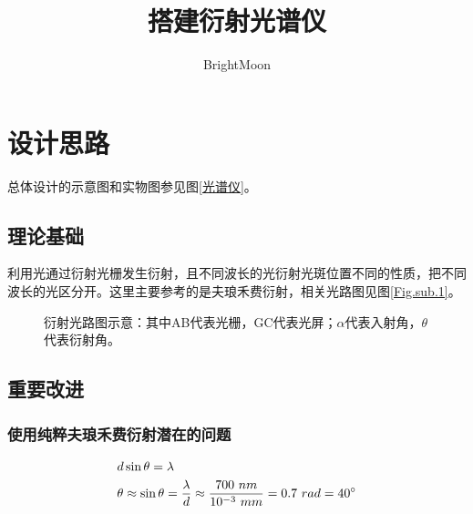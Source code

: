 \documentclass[UTF8]{ctexart}
\title{搭建衍射光谱仪}
\author{BrightMoon}
\begin{document}
\maketitle
\section{设计思路}
总体设计的示意图和实物图参见图\ref{光谱仪}。
\subsection{理论基础}
利用光通过衍射光栅发生衍射，且不同波长的光衍射光斑位置不同的性质，把不同波长的光区分开。这里主要参考的是夫琅禾费衍射，相关光路图见图\ref{Fig.sub.1}。
\begin{figure}
\centering  %
\caption{衍射光路图示意：其中AB代表光栅，GC代表光屏；$\alpha$代表入射角，$\theta$代表衍射角。}
\label{光路示意}
\end{figure}
\subsection{重要改进}
\subsubsection{使用纯粹夫琅禾费衍射潜在的问题}
\begin{align}
    &d\sin \theta = \lambda\\
    &\theta \approx \sin \theta = \frac{\lambda}{d}\approx \frac{700\ nm}{10^{-3}\ mm}=0.7\ rad=40\degree
\end{align}
\end{document}
